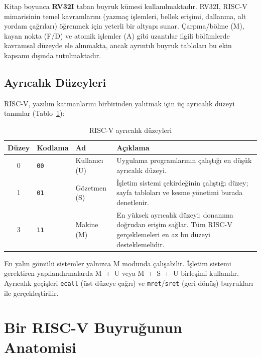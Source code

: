 \begin{bilginot}
Kitap boyunca \textbf{RV32I} taban buyruk kümesi kullanılmaktadır. RV32I, RISC-V mimarisinin temel kavramlarını (yazmaç işlemleri, bellek erişimi, dallanma, alt yordam çağrıları) öğrenmek için yeterli bir altyapı sunar. Çarpma/bölme (M), kayan nokta (F/D) ve atomik işlemler (A) gibi uzantılar ilgili bölümlerde kavramsal düzeyde ele alınmakta, ancak ayrıntılı buyruk tabloları bu ekin kapsamı dışında tutulmaktadır.
\end{bilginot}

\subsection{Ayrıcalık Düzeyleri}
\label{subsec:ekc-ayricalik}

RISC-V, yazılım katmanlarını birbirinden yalıtmak için üç ayrıcalık düzeyi tanımlar (Tablo~\ref{tab:ekc-ayricalik}):

\begin{table}[H]
\centering
\caption{RISC-V ayrıcalık düzeyleri}\label{tab:ekc-ayricalik}
\begin{tabular}{@{}cllp{7.5cm}@{}}
\toprule
\textbf{Düzey} & \textbf{Kodlama} & \textbf{Ad} & \textbf{Açıklama} \\
\midrule
0 & \texttt{00} & Kullanıcı (U) & Uygulama programlarının çalıştığı en düşük ayrıcalık düzeyi. \\
1 & \texttt{01} & Gözetmen (S) & İşletim sistemi çekirdeğinin çalıştığı düzey; sayfa tabloları ve kesme yönetimi burada denetlenir. \\
3 & \texttt{11} & Makine (M) & En yüksek ayrıcalık düzeyi; donanıma doğrudan erişim sağlar. Tüm RISC-V gerçeklemeleri en az bu düzeyi desteklemelidir. \\
\bottomrule
\end{tabular}
\end{table}

En yalın gömülü sistemler yalnızca M modunda çalışabilir. İşletim sistemi gerektiren yapılandırmalarda M~+~U veya M~+~S~+~U birleşimi kullanılır. Ayrıcalık geçişleri \texttt{ecall} (üst düzeye çağrı) ve \texttt{mret}/\texttt{sret} (geri dönüş) buyrukları ile gerçekleştirilir.

\section{Bir RISC-V Buyruğunun Anatomisi}
\label{sec:ekc-buyruk-anatomisi}

